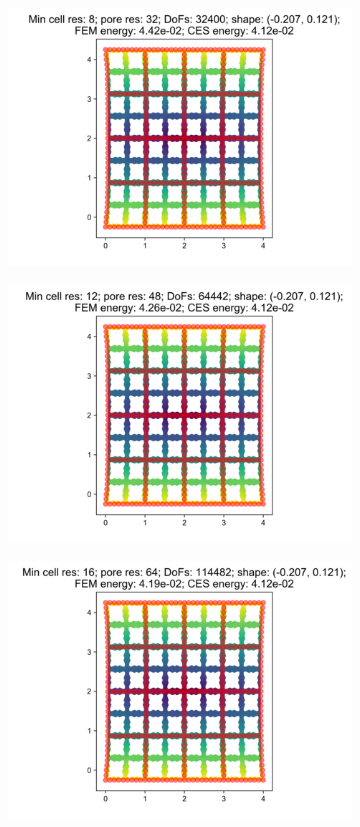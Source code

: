 \begin{figure}[H]
\begin{subfigure}{.45\textwidth}
\end{subfigure}
\begin{subfigure}{.45\textwidth}
  \centering
  \includegraphics[width=.8\linewidth]{lces/vis_tension/bm_0_mesh_3.png}
\end{subfigure}
\newline
\begin{subfigure}{.45\textwidth}
  \centering
  \includegraphics[width=.8\linewidth]{lces/vis_tension/bm_0_mesh_4.png}
\end{subfigure}
\begin{subfigure}{.45\textwidth}
  \centering
  \includegraphics[width=.8\linewidth]{lces/vis_tension/bm_0_mesh_5.png}
\end{subfigure}
\end{figure}

